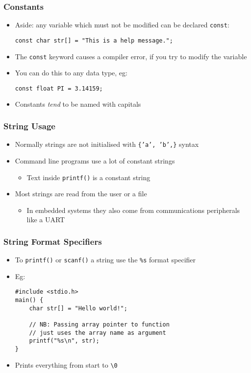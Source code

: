 \documentclass[14pt]{beamer}
\begin{document}
\begin{frame}[fragile]
\frametitle{Constants}
\begin{itemize}
\item Aside: any variable which must not be modified can be declared \texttt{const}:
\begin{lstlisting}[style=CStyle]
const char str[] = "This is a help message.";
\end{lstlisting}
\item The \texttt{const} keyword causes a compiler error, if you try to modify the variable
\item You can do this to any data type, eg:
\begin{lstlisting}[style=CStyle]
const float PI = 3.14159;
\end{lstlisting}
\item Constants \textit{tend} to be named with capitals
\end{itemize}
\end{frame}

\begin{frame}
\frametitle{String Usage}
\begin{itemize}
\item Normally strings are not initialised with \texttt{\{'a', 'b',\}} syntax
\item Command line programs use a lot of constant strings
	\begin{itemize}
		\item Text inside \texttt{printf()} is a constant string
	\end{itemize}
\item Most strings are read from the user or a file
	\begin{itemize}
		\item In embedded systems they also come from communications peripherals like a UART
	\end{itemize}
\end{itemize}
\end{frame}

\begin{frame}[fragile]
\frametitle{String Format Specifiers}
\begin{itemize}
\item To \texttt{printf()} or \texttt{scanf()} a string use the \texttt{\%s} format specifier
\item Eg:
\begin{lstlisting}[style=CStyle]
#include <stdio.h>
main() {
	char str[] = "Hello world!";
	
	// NB: Passing array pointer to function
	// just uses the array name as argument
	printf("%s\n", str);
}
\end{lstlisting}
\item Prints everything from start to \texttt{\textbackslash 0}
\end{itemize}
\end{frame}
\end{document}
